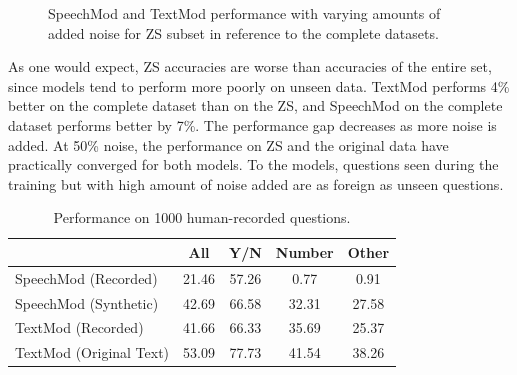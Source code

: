 \documentclass[letterpaper]{article} %
\begin{document}
\pgfplotsset{width=8cm,compat=1.9}
\begin{figure}[t]
\centering
{}
\caption{SpeechMod and TextMod performance with varying amounts of added noise for ZS subset in reference to the complete datasets.}
\label{fig:noiseplots-zs}
\end{figure}


As one would expect, ZS accuracies are worse than accuracies of the entire set, since models tend to perform more poorly on unseen data. TextMod performs 4\% better on the complete dataset than on the ZS, and SpeechMod on the complete dataset performs better by 7\%. The performance gap decreases as more noise is added. At 50\% noise, the performance on ZS and the original data have practically converged for both models. To the models, questions seen during the training but with high amount of noise added are as foreign as unseen questions. 


\begin{table}[t]
\centering
\caption{Performance on 1000 human-recorded questions.}
\label{table:recorded}
\begin{tabular}{l|cccc}
                        & All   & Y/N   & Number & Other \\ \hline
SpeechMod (Recorded)    & 21.46 & 57.26 & 0.77   & 0.91  \\
SpeechMod (Synthetic)   & 42.69 & 66.58 & 32.31  & 27.58 \\ \hline
TextMod (Recorded)      & 41.66 & 66.33 & 35.69  & 25.37 \\
TextMod (Original Text) & 53.09 & 77.73 & 41.54  & 38.26
\end{tabular}
\end{table}
\end{document}

